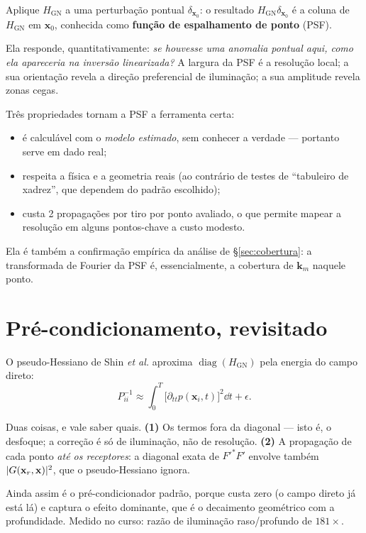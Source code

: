 \documentclass[11pt,a4paper,oneside]{report}
\begin{document}
\begin{teoria}
Aplique $H_{\text{GN}}$ a uma perturba\c{c}\~ao pontual $\delta_{\mathbf{x}_0}$:
o resultado $H_{\text{GN}}\delta_{\mathbf{x}_0}$ \'e a coluna de
$H_{\text{GN}}$ em $\mathbf{x}_0$, conhecida como \textbf{fun\c{c}\~ao de
espalhamento de ponto} (PSF).

Ela responde, quantitativamente: \emph{se houvesse uma anomalia pontual aqui,
como ela apareceria na invers\~ao linearizada?} A largura da PSF \'e a
resolu\c{c}\~ao local; a sua orienta\c{c}\~ao revela a dire\c{c}\~ao
preferencial de ilumina\c{c}\~ao; a sua amplitude revela zonas cegas.

Tr\^es propriedades tornam a PSF a ferramenta certa:
\begin{itemize}[leftmargin=*, itemsep=1pt]
\item \'e calcul\'avel com o \emph{modelo estimado}, sem conhecer a verdade ---
portanto serve em dado real;
\item respeita a f\'isica e a geometria reais (ao contr\'ario de testes de
``tabuleiro de xadrez'', que dependem do padr\~ao escolhido);
\item custa 2 propaga\c{c}\~oes por tiro por ponto avaliado, o que permite
mapear a resolu\c{c}\~ao em alguns pontos-chave a custo modesto.
\end{itemize}

Ela \'e tamb\'em a confirma\c{c}\~ao emp\'irica da an\'alise de
§\ref{sec:cobertura}: a transformada de Fourier da PSF \'e, essencialmente, a
cobertura de $\mathbf{k}_m$ naquele ponto.
\end{teoria}

\section{Pr\'e-condicionamento, revisitado}

O pseudo-Hessiano de Shin \emph{et al.} aproxima
$\operatorname{diag}(H_{\text{GN}})$ pela energia do campo direto:
\begin{equation}
P^{-1}_{ii} \approx \int_0^T\bigl[\partial_{tt}p(\mathbf{x}_i,t)\bigr]^{2}\dd t
 + \epsilon .
\end{equation}

\begin{atencao}
Duas coisas, e vale saber quais. \textbf{(1)} Os termos fora da diagonal ---
isto \'e, o desfoque; a corre\c{c}\~ao \'e s\'o de ilumina\c{c}\~ao, n\~ao de
resolu\c{c}\~ao. \textbf{(2)} A propaga\c{c}\~ao de cada ponto \emph{at\'e os
receptores}: a diagonal exata de $F'^{*}F'$ envolve tamb\'em
$\lvert G(\mathbf{x}_r,\mathbf{x}) \rvert^{2}$, que o pseudo-Hessiano ignora.

Ainda assim \'e o pr\'e-condicionador padr\~ao, porque custa zero (o campo
direto j\'a est\'a l\'a) e captura o efeito dominante, que \'e o decaimento
geom\'etrico com a profundidade. Medido no curso: raz\~ao de ilumina\c{c}\~ao
raso/profundo de $181\times$.
\end{atencao}
\end{document}
